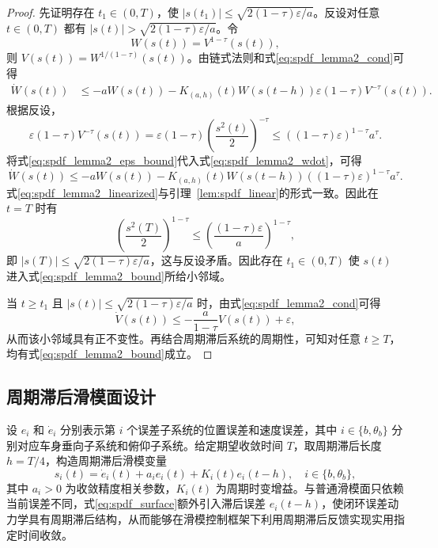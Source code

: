 \begin{proof}
先证明存在 $t_1\in(0,T)$，使 $|s(t_1)|\leq \sqrt{2(1-\tau)\varepsilon/a}$。反设对任意 $t\in(0,T)$ 都有
$|s(t)|>\sqrt{2(1-\tau)\varepsilon/a}$。令
\begin{equation}
W(s(t))=V^{1-\tau}(s(t)),
\label{eq:spdf_lemma2_W}
\end{equation}
则 $V(s(t))=W^{1/(1-\tau)}(s(t))$。由链式法则和式\eqref{eq:spdf_lemma2_cond}可得
\begin{align}
\dot W(s(t))
&\leq -aW(s(t))-K_{(a,h)}(t)W(s(t-h))
\varepsilon(1-\tau)V^{-\tau}(s(t)).
\label{eq:spdf_lemma2_wdot}
\end{align}
根据反设，
\begin{equation}
\varepsilon(1-\tau)V^{-\tau}(s(t))
=\varepsilon(1-\tau)\left(\frac{s^2(t)}{2}\right)^{-\tau}
\leq ((1-\tau)\varepsilon)^{1-\tau}a^\tau .
\label{eq:spdf_lemma2_eps_bound}
\end{equation}
将式\eqref{eq:spdf_lemma2_eps_bound}代入式\eqref{eq:spdf_lemma2_wdot}，可得
\begin{equation}
\dot W(s(t))
\leq -aW(s(t))-K_{(a,h)}(t)W(s(t-h))
((1-\tau)\varepsilon)^{1-\tau}a^\tau .
\label{eq:spdf_lemma2_linearized}
\end{equation}
式\eqref{eq:spdf_lemma2_linearized}与引理~\ref{lem:spdf_linear}的形式一致。因此在 $t=T$ 时有
\begin{equation}
\left(\frac{s^2(T)}{2}\right)^{1-\tau}
\leq
\left(\frac{(1-\tau)\varepsilon}{a}\right)^{1-\tau},
\label{eq:spdf_lemma2_contradiction}
\end{equation}
即 $|s(T)|\leq \sqrt{2(1-\tau)\varepsilon/a}$，这与反设矛盾。因此存在 $t_1\in(0,T)$ 使 $s(t)$ 进入式\eqref{eq:spdf_lemma2_bound}所给小邻域。

当 $t\geq t_1$ 且 $|s(t)|\leq \sqrt{2(1-\tau)\varepsilon/a}$ 时，由式\eqref{eq:spdf_lemma2_cond}可得
\begin{equation}
\dot V(s(t))\leq -\frac{a}{1-\tau}V(s(t))+\varepsilon,
\label{eq:spdf_lemma2_invariant}
\end{equation}
从而该小邻域具有正不变性。再结合周期滞后系统的周期性，可知对任意 $t\geq T$，均有式\eqref{eq:spdf_lemma2_bound}成立。
\end{proof}

\subsection{周期滞后滑模面设计}
设 $e_i$ 和 $\dot e_i$ 分别表示第 $i$ 个误差子系统的位置误差和速度误差，其中 $i\in\{b,\theta_b\}$ 分别对应车身垂向子系统和俯仰子系统。给定期望收敛时间 $T$，取周期滞后长度 $h=T/4$，构造周期滞后滑模变量
\begin{equation}
s_i(t)=\dot e_i(t)+a_i e_i(t)+K_i(t)e_i(t-h),
\quad i\in\{b,\theta_b\},
\label{eq:spdf_surface}
\end{equation}
其中 $a_i>0$ 为收敛精度相关参数，$K_i(t)$ 为周期时变增益。与普通滑模面只依赖当前误差不同，式\eqref{eq:spdf_surface}额外引入滞后误差 $e_i(t-h)$，使闭环误差动力学具有周期滞后结构，从而能够在滑模控制框架下利用周期滞后反馈实现实用指定时间收敛。

